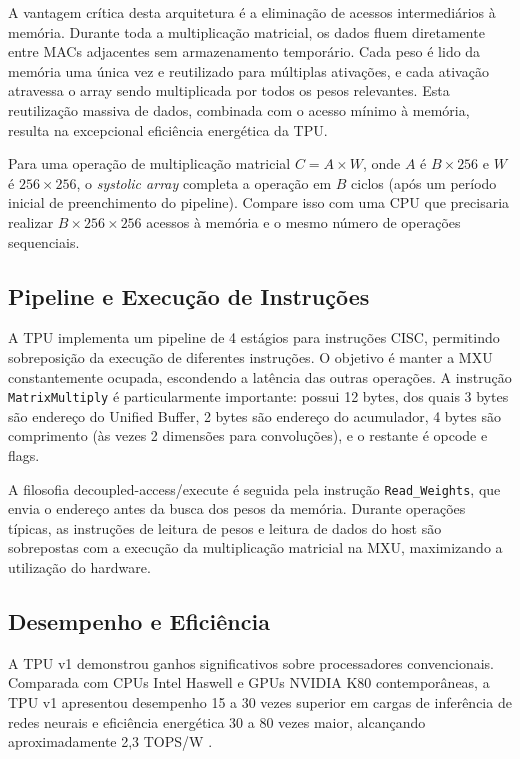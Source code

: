 \documentclass[12pt,a4paper]{article}
\begin{document}
A vantagem crítica desta arquitetura é a eliminação de acessos intermediários à memória. Durante toda a multiplicação matricial, os dados fluem diretamente entre MACs adjacentes sem armazenamento temporário. Cada peso é lido da memória uma única vez e reutilizado para múltiplas ativações, e cada ativação atravessa o array sendo multiplicada por todos os pesos relevantes. Esta reutilização massiva de dados, combinada com o acesso mínimo à memória, resulta na excepcional eficiência energética da TPU.

Para uma operação de multiplicação matricial $C = A \times W$, onde $A$ é $B \times 256$ e $W$ é $256 \times 256$, o \textit{systolic array} completa a operação em $B$ ciclos (após um período inicial de preenchimento do pipeline). Compare isso com uma CPU que precisaria realizar $B \times 256 \times 256$ acessos à memória e o mesmo número de operações sequenciais.

\subsection{Pipeline e Execução de Instruções}

A TPU implementa um pipeline de 4 estágios para instruções CISC, permitindo sobreposição da execução de diferentes instruções. O objetivo é manter a MXU constantemente ocupada, escondendo a latência das outras operações. A instrução \texttt{MatrixMultiply} é particularmente importante: possui 12 bytes, dos quais 3 bytes são endereço do Unified Buffer, 2 bytes são endereço do acumulador, 4 bytes são comprimento (às vezes 2 dimensões para convoluções), e o restante é opcode e flags.

A filosofia decoupled-access/execute é seguida pela instrução \texttt{Read\_Weights}, que envia o endereço antes da busca dos pesos da memória. Durante operações típicas, as instruções de leitura de pesos e leitura de dados do host são sobrepostas com a execução da multiplicação matricial na MXU, maximizando a utilização do hardware.

\subsection{Desempenho e Eficiência}

A TPU v1 demonstrou ganhos significativos sobre processadores convencionais. Comparada com CPUs Intel Haswell e GPUs NVIDIA K80 contemporâneas, a TPU v1 apresentou desempenho 15 a 30 vezes superior em cargas de inferência de redes neurais e eficiência energética 30 a 80 vezes maior, alcançando aproximadamente 2,3 TOPS/W \cite{jouppi_tpu_paper_2017}.
\end{document}
